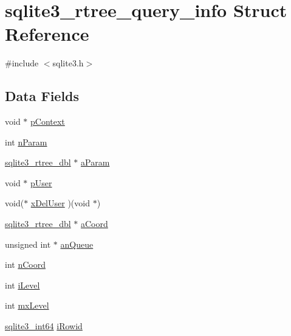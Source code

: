 \hypertarget{structsqlite3__rtree__query__info}{}\section{sqlite3\+\_\+rtree\+\_\+query\+\_\+info Struct Reference}
\label{structsqlite3__rtree__query__info}


{\ttfamily \#include $<$sqlite3.\+h$>$}

\subsection*{Data Fields}
\begin{DoxyCompactItemize}
\item 
void $\ast$ \hyperlink{structsqlite3__rtree__query__info_a421c653f7747c70d1e422f06b75e7f53}{p\+Context}
\item 
int \hyperlink{structsqlite3__rtree__query__info_ab3346bd10d8072caf8ec019ceeb3224e}{n\+Param}
\item 
\hyperlink{sqlite3_8c_ae9156ff58620c1ceae9391f1afabae1b}{sqlite3\+\_\+rtree\+\_\+dbl} $\ast$ \hyperlink{structsqlite3__rtree__query__info_ad8bcfe2630b76222947d6d78f4657a93}{a\+Param}
\item 
void $\ast$ \hyperlink{structsqlite3__rtree__query__info_a6ffcfefabc1d53128f66ef895058a6e2}{p\+User}
\item 
void($\ast$ \hyperlink{structsqlite3__rtree__query__info_aa90fafba5714bc276f69c04adae44256}{x\+Del\+User} )(void $\ast$)
\item 
\hyperlink{sqlite3_8c_ae9156ff58620c1ceae9391f1afabae1b}{sqlite3\+\_\+rtree\+\_\+dbl} $\ast$ \hyperlink{structsqlite3__rtree__query__info_a65ecb5e2c6c6ab1302a62d63d3955408}{a\+Coord}
\item 
unsigned int $\ast$ \hyperlink{structsqlite3__rtree__query__info_ae21e3f4dc35e156904ecce486ac2e4d0}{an\+Queue}
\item 
int \hyperlink{structsqlite3__rtree__query__info_a4a35db4265f1fafb631f4ea5a0d94dc3}{n\+Coord}
\item 
int \hyperlink{structsqlite3__rtree__query__info_ad73f24067e0eae67be577280724e2eef}{i\+Level}
\item 
int \hyperlink{structsqlite3__rtree__query__info_aaa48ccab5dc5e8c8bd5063ad540b64c5}{mx\+Level}
\item 
\hyperlink{sqlite3_8c_a0a4d3e6c1ad46f90e746b920ab6ca0d2}{sqlite3\+\_\+int64} \hyperlink{structsqlite3__rtree__query__info_a851d167cb330f8d955b132fbb06e3b59}{i\+Rowid}

\end{DoxyCompactItemize}
